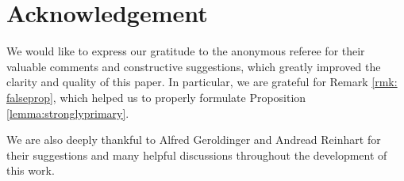 \documentclass[a4paper, 10pt]{amsart}
\theoremstyle{plain}
\theoremstyle{definition}
\theoremstyle{remark}
\numberwithin{equation}{section}
\begin{document}
\section*{Acknowledgement}
We would like to express our gratitude to the anonymous referee for their valuable comments and constructive suggestions, which greatly improved the clarity and quality of this paper. In particular, we are grateful for Remark \ref{rmk: falseprop}, which helped us to properly formulate Proposition \ref{lemma:stronglyprimary}.

We are also deeply thankful to Alfred Geroldinger and Andread Reinhart for their suggestions and many helpful discussions throughout the development of this work.
    


\providecommand{\bysame}{\leavevmode\hbox to3em{\hrulefill}\thinspace}
\providecommand{\MR}{\relax\ifhmode\unskip\space\fi MR }
\providecommand{\MRhref}[2]{%
  \href{http://www.ams.org/mathscinet-getitem?mr=#1}{#2}
}
 
\end{document}

